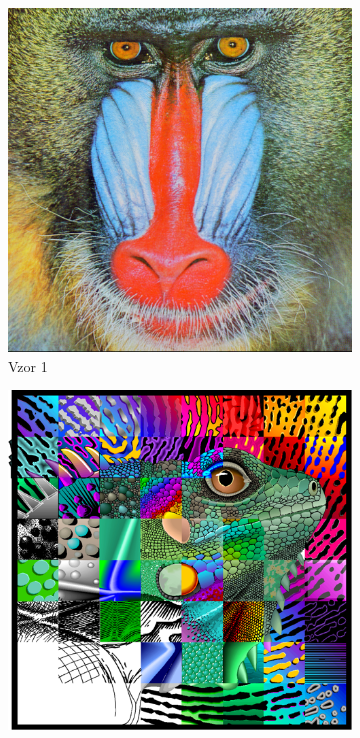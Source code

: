 \documentclass[a4paper,11pt,titlepage]{scrartcl}
\begin{document}
\begin{figure}[!h]
    \centering
    \begin{subfigure}[b]{0.4\textwidth}
        \includegraphics[width=\textwidth]{img/example1.png}
        \caption{Vzor 1}
        \label{fig:gull}
    \end{subfigure}
    \begin{subfigure}[b]{0.4\textwidth}
        \includegraphics[width=\textwidth]{img/example2.png}

\end{subfigure}
\end{figure}
\end{document}
